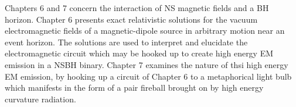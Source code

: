 Chapters 6 and 7 concern the interaction of NS magnetic fields and a BH
horizon. Chapter 6 presents exact relativistic solutions for the vacuum
electromagnetic fields of a magnetic-dipole source in arbitrary motion near an
event horizon. The solutions are used to interpret and elucidate the
electromagnetic circuit which may be hooked up to create high energy EM
emission in a NSBH binary. Chapter 7 examines the nature of thsi high energy EM emission, by hooking up a circuit of Chapter 6 to a metaphorical light
bulb which manifests in the form of a pair fireball brought on by high energy
curvature radiation.

























